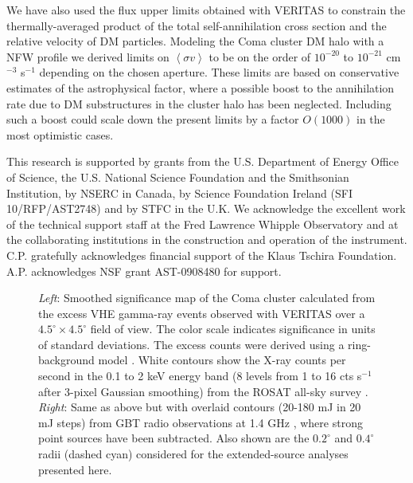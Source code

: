\documentclass[12pt,manuscript]{aastex}
\newcommand{\expval}[1]{\left\langle #1 \right\rangle}
\begin{document}
We have also used the flux upper limits obtained with VERITAS to constrain the thermally-averaged
product of the total self-annihilation cross section and the relative velocity of DM
particles. Modeling the Coma cluster DM halo with a NFW profile we derived limits on
$\expval{\sigma v}$ to be on the order of $10^{-20}$ to $10^{-21}$ cm$^{-3}$ s$^{-1}$ depending on
the chosen aperture. These limits are based on conservative estimates of the astrophysical factor,
where a possible boost to the annihilation rate due to DM substructures in the cluster halo has
been neglected. Including such a boost could scale down the present limits by a factor $O(1000)$ in
the most optimistic cases.

\acknowledgments
This research is supported by grants from the U.S. Department of Energy Office of Science, the U.S.
National Science Foundation and the Smithsonian Institution, by NSERC in Canada, by Science
Foundation Ireland (SFI 10/RFP/AST2748) and by STFC in the U.K. We acknowledge the excellent work
of the technical support staff at the Fred Lawrence Whipple Observatory and at the collaborating
institutions in the construction and operation of the instrument. C.P. gratefully acknowledges 
financial support of the Klaus Tschira Foundation. A.P. acknowledges 
NSF grant AST-0908480 for support.





\begin{figure*}
\begin{center}
\end{center}
\caption{\emph{Left}: Smoothed significance map of the Coma cluster calculated from the excess VHE
gamma-ray events observed with VERITAS over a $4.5^{\circ}\times 4.5^{\circ}$ field of view.
The color scale indicates significance in units of standard deviations. The excess counts were
derived using a ring-background model \citep{article:Aharonian_etal:2001}.
White contours show the X-ray counts per second in the 0.1 to 2 keV energy band
(8 levels from 1 to 16 cts s$^{-1}$ after 3-pixel Gaussian smoothing) from the ROSAT
all-sky survey \citep{article:BrielHenryBohringer:1992}. \emph{Right}: Same as above but with
overlaid contours (20-180 mJ in 20 mJ steps) from GBT radio observations at 1.4 GHz \citep{article:BrownRudnick:2010}, where
strong point sources have been subtracted. Also shown are the $0.2^{\circ}$ and $0.4^{\circ}$ radii
(dashed cyan) considered for the extended-source analyses presented here.}
\label{fig:skymaps}
\end{figure*}
\end{document}
